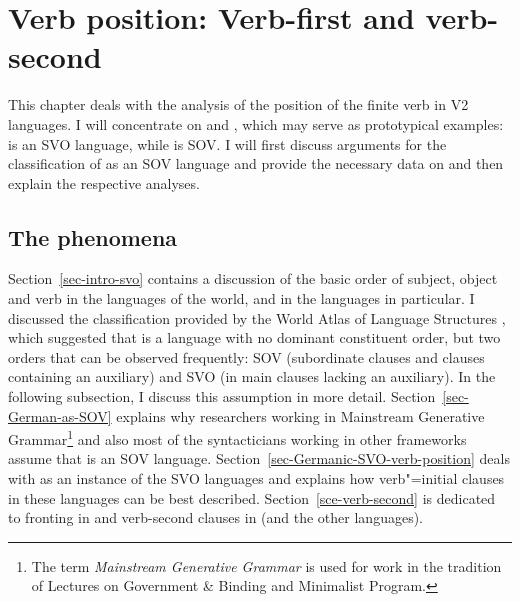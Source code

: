 \chapter{Verb position: Verb-first and verb-second}
\label{chap-verb-position}

This chapter deals with the analysis of the position of the finite verb in V2 languages. I will concentrate on
 and , which may serve as prototypical examples:  is an SVO language, while 
is SOV. I will first discuss arguments for the classification of  as an SOV language and
provide the necessary data on  and then explain the respective analyses.

\section{The phenomena}

Section~\ref{sec-intro-svo} contains a discussion of the basic order of subject, object and verb in the languages
of the world, and in the  languages in particular. I discussed the classification provided by
the World Atlas of Language Structures \citep{Dryer2013a}, which suggested that  is a language with no dominant
constituent order, but two orders that can be observed frequently: SOV (subordinate clauses and
clauses containing an auxiliary) and SVO (in main clauses lacking an auxiliary). 
In the following subsection, I discuss this
assumption in more detail. Section~\ref{sec-German-as-SOV} explains why researchers working in
Mainstream Generative Grammar\footnote{
  The term \emph{Mainstream Generative Grammar} is used for work in the tradition of
   Lectures on Government \& Binding and  Minimalist Program. 
} and also most of the syntacticians working in other frameworks assume
that  is an SOV language. Section~\ref{sec-Germanic-SVO-verb-position} deals with  as an
instance of the  SVO languages and explains how verb"=initial clauses in these languages
can be best described. Section~\ref{sce-verb-second} is dedicated to fronting in  and
verb-second clauses in  (and the other  languages).

